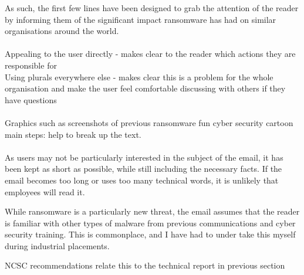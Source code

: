 \documentclass{article}
\begin{document}
As such, the first few lines have been designed to grab the attention of the reader by informing them of the significant impact ransomware has had on similar organisations around the world.
\\\\
Appealing to the user directly - makes clear to the reader which actions they are responsible for\\
Using plurals everywhere else - makes clear this is a problem for the whole organisation and make the user feel comfortable discussing with others if they have questions
\\\\
Graphics such as 
	screenshots of previous ransomware
	fun cyber security cartoon
	main steps:
help to break up the text.
\\\\


As users may not be particularly interested in the subject of the email, it has been kept as short as possible, while still including the necessary facts.
If the email becomes too long or uses too many technical words, it is unlikely that employees will read it.

While ransomware is a particularly new threat, the email assumes that the reader is familiar with other types of malware from previous communications and cyber security training.
This is commonplace, and I have had to under take this myself during industrial placements.

NCSC recommendations
relate this to the technical report in previous section
\end{document}
